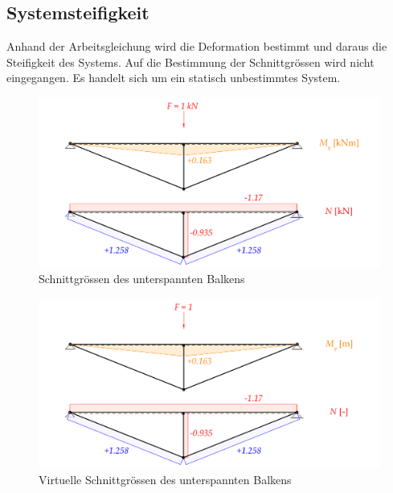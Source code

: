 \documentclass[
  letterpaper,
  DIV=11]{scrreprt}
\begin{document}
\hypertarget{systemsteifigkeit-2}{%
\subsection{Systemsteifigkeit}\label{systemsteifigkeit-2}}

Anhand der Arbeitsgleichung wird die Deformation bestimmt und daraus die
Steifigkeit des Systems. Auf die Bestimmung der Schnittgrössen wird
nicht eingegangen. Es handelt sich um ein statisch unbestimmtes System.

\begin{figure}[H]

{\centering \includegraphics{index_files/mediabag/bilder/aufgabe_ems_fourier_schnittgroessen.pdf}

}

\caption{\label{fig-ems-fourier_schnittgroessen_real}Schnittgrössen des
unterspannten Balkens}

\end{figure}

\begin{figure}[H]

{\centering \includegraphics{index_files/mediabag/bilder/aufgabe_ems_fourier_schnittgroessen_fikt.pdf}

}

\caption{\label{fig-ems-fourier_schnittgroessen_virt}Virtuelle
Schnittgrössen des unterspannten Balkens}

\end{figure}
\end{document}
